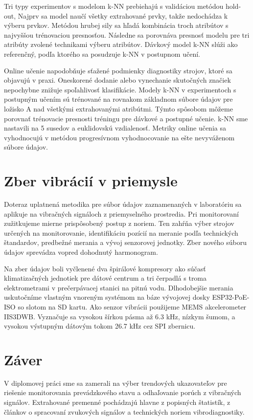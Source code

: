 Tri typy experimentov s modelom k-NN prebiehajú s validáciou metódou hold-out, Najprv sa model naučí všetky extrahované prvky, takže nedochádza k výberu prvkov. Metódou hrubej sily sa hľadá kombinácia troch atribútov s najvyššou trénovaciou presnosťou. Následne sa porovnáva presnosť modelu pre tri atribúty zvolené technikami výberu atribútov. Dávkový model k-NN slúži ako referenčný, podľa ktorého sa posudzuje k-NN v postupnom učení.

Online učenie napodobňuje sťažené podmienky diagnostiky strojov, ktoré sa objavujú v praxi. Oneskorené dodanie alebo vynechanie skutočných značiek nepochybne znižuje spoľahlivosť klasifikácie. Modely k-NN v experimentoch s postupným učením sú trénované na rovnakom základnom súbore údajov pre ložisko A nad všetkými extrahovanými atribútmi. Týmto spôsobom môžeme porovnať trénovacie presnosti tréningu pre dávkové a postupné učenie. k-NN sme nastavili na 5 susedov a euklidovskú vzdialenosť. Metriky online učenia sa vyhodnocujú v metódou progresívnom vyhodnocovanie na ešte nevyváženom súbore údajov.

\section{Zber vibrácií v priemysle}
Doteraz uplatnená metodika pre súbor údajov zaznamenaných v laboratóriu sa aplikuje na vibračných signáloch z priemyselného prostredia. Pri monitorovaní zužitkujeme mierne prispôsobený postup z noriem. Ten zahŕňa výber strojov určených na monitorovanie, identifikáciu pozícií na meranie podľa technických štandardov, predbežné merania a vývoj senzorovej jednotky. Zber nového súboru údajov sprevádza vopred dohodnutý harmonogram.

Na zber údajov boli vyčlenené dva špirálové kompresory ako súčasť klimatizačných jednotiek pre dátové centrum a tri čerpadlá s troma elektrometrami v prečerpávacej stanici na pitnú vodu. Dlhodobejšie merania uskutočníme vlastným vnoreným systémom na báze vývojovej dosky ESP32-PoE-ISO so slotom na SD kartu. Ako senzor vibrácii použijeme MEMS akcelerometer IIS3DWB. Vyznačuje sa vysokou šírkou pásma až 6.3 kHz, nízkym šumom, a vysokou výstupným dátovým tokom 26.7 kHz cez SPI zbernicu.

\section{Záver}
V diplomovej práci sme sa zamerali na výber trendových ukazovateľov pre riešenie monitorovania prevádzkového stavu a odhaľovanie porúch z vibračných signálov.  Extrahované premenné pochádzajú hlavne z popisných štatistík, z článkov o spracovaní zvukových signálov a technických noriem vibrodiagnostiky.

